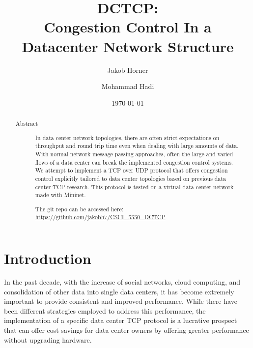 \documentclass[%
amsmath,amssymb,
aps,
]{revtex4-2}
\begin{document}
\title{DCTCP:\\Congestion Control In a Datacenter Network Structure}

\author{Jakob Horner}

\author{Mohammad Hadi}


\date{\today}

\begin{abstract}
\begin{description}
\item[Abstract]
In data center network topologies, there are often strict expectations on throughput and round trip time even when dealing with large amounts of data. With normal network message passing approaches, often the large and varied flows of a data center can break the implemented congestion control systems. We attempt to implement a TCP over UDP protocol that offers congestion control explicitly tailored to data center topologies based on previous data center TCP research. This protocol is tested on a virtual data center network made with Mininet. 

The git repo can be accessed here: \url{https://github.com/jakobh7/CSCI_5550_DCTCP}
\end{description}
\end{abstract}

\maketitle

\section{Introduction}
In the past decade, with the increase of social networks, cloud computing, and consolidation of  other data into single data centers, it has become extremely important to provide consistent and improved performance. While there have been different strategies employed to address this performance, the implementation of a specific data center TCP protocol is a lucrative prospect that can offer cost savings for data center owners by offering greater performance without upgrading hardware.
\end{document}
